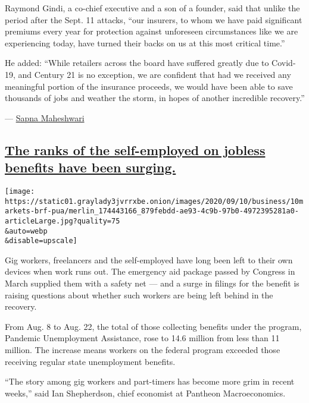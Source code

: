 Raymond Gindi, a co-chief executive and a son of a founder, said that
unlike the period after the Sept. 11 attacks, ``our insurers, to whom we
have paid significant premiums every year for protection against
unforeseen circumstances like we are experiencing today, have turned
their backs on us at this most critical time.''

He added: ``While retailers across the board have suffered greatly due
to Covid-19, and Century 21 is no exception, we are confident that had
we received any meaningful portion of the insurance proceeds, we would
have been able to save thousands of jobs and weather the storm, in hopes
of another incredible recovery.''

--- \href{https://www.nytimes3xbfgragh.onion/by/sapna-maheshwari}{Sapna
Maheshwari}

\hypertarget{the-ranks-of-the-self-employed-on-jobless-benefits-have-been-surging}{%
\subsection{\texorpdfstring{\protect\hyperlink{the-ranks-of-the-self-employed-on-jobless-benefits-have-been-surging}{The
ranks of the self-employed on jobless benefits have been
surging.}}{The ranks of the self-employed on jobless benefits have been surging.}}\label{the-ranks-of-the-self-employed-on-jobless-benefits-have-been-surging}}

\texttt{[image: https://static01.graylady3jvrrxbe.onion/images/2020/09/10/business/10markets-brf-pua/merlin\_174443166\_879febdd-ae93-4c9b-97b0-4972395281a0-articleLarge.jpg?quality=75\\\&auto=webp\\\&disable=upscale]}

Gig workers, freelancers and the self-employed have long been left to
their own devices when work runs out. The emergency aid package passed
by Congress in March supplied them with a safety net --- and a surge in
filings for the benefit is raising questions about whether such workers
are being left behind in the recovery.

From Aug. 8 to Aug. 22, the total of those collecting benefits under the
program, Pandemic Unemployment Assistance, rose to 14.6 million from
less than 11 million. The increase means workers on the federal program
exceeded those receiving regular state unemployment benefits.

``The story among gig workers and part-timers has become more grim in
recent weeks,'' said Ian Shepherdson, chief economist at Pantheon
Macroeconomics.

